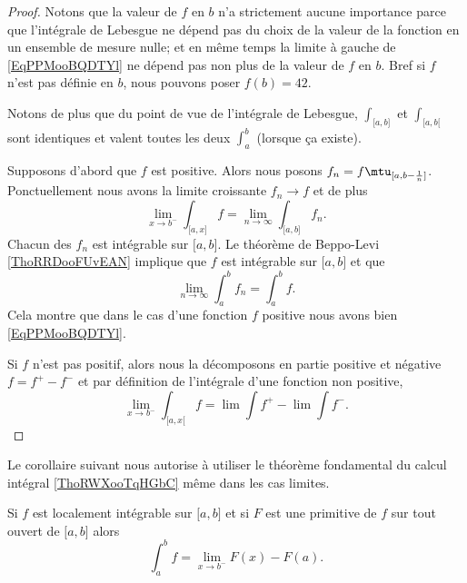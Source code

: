 \begin{proof}
    Notons que la valeur de \( f\) en \( b\) n'a strictement aucune importance parce que l'intégrale de Lebesgue ne dépend pas du choix de la valeur de la fonction en un ensemble de mesure nulle; et en même temps la limite à gauche de \eqref{EqPPMooBQDTYl} ne dépend pas non plus de la valeur de \( f\) en \( b\). Bref si \( f\) n'est pas définie en \( b\), nous pouvons poser \( f(b)=42\).

    Notons de plus que du point de vue de l'intégrale de Lebesgue, \( \int_{\mathopen[ a , b \mathclose]}\) et \( \int_{\mathopen[ a , b [}\) sont identiques et valent toutes les deux \( \int_a^b\) (lorsque ça existe).

    Supposons d'abord que \( f\) est positive. Alors nous posons \( f_n=f\mtu_{\mathopen[ a , b-\frac{1}{ n } \mathclose]}\). Ponctuellement nous avons la limite croissante \( f_n\to f\) et de plus
    \begin{equation}
        \lim_{x\to b^-} \int_{\mathopen[ a , x \mathclose]}f=\lim_{n\to \infty} \int_{\mathopen[ a , b \mathclose]}f_n.
    \end{equation}
    Chacun des \( f_n\) est intégrable sur \( \mathopen[ a , b \mathclose]\). Le théorème de Beppo-Levi \ref{ThoRRDooFUvEAN} implique que \( f\) est intégrable sur \( \mathopen[ a , b \mathclose]\) et que
    \begin{equation}
        \lim_{n\to \infty} \int_a^bf_n=\int_a^bf.
    \end{equation}
    Cela montre que dans le cas d'une fonction \( f\) positive nous avons bien \eqref{EqPPMooBQDTYl}.

    Si \( f\) n'est pas positif, alors nous la décomposons en partie positive et négative \( f=f^+-f^{-}\) et par définition de l'intégrale d'une fonction non positive,
    \begin{equation}
        \lim_{x\to b^-} \int_{\mathopen[ a , x [}f=\lim\int f^{+}-\lim\int f^-.
    \end{equation}
\end{proof}

Le corollaire suivant nous autorise à utiliser le théorème fondamental du calcul intégral \ref{ThoRWXooTqHGbC} même dans les cas limites.
\begin{corollary}   \label{CorMUIooXREleR}
    Si \( f\) est localement intégrable sur \( \mathopen[ a , b \mathclose]\) et si \( F\) est une primitive de \( f\) sur tout ouvert de \( \mathopen[ a , b \mathclose]\) alors
    \begin{equation}
        \int_a^bf=\lim_{x\to b^-} F(x)-F(a).
    \end{equation}
\end{corollary}

